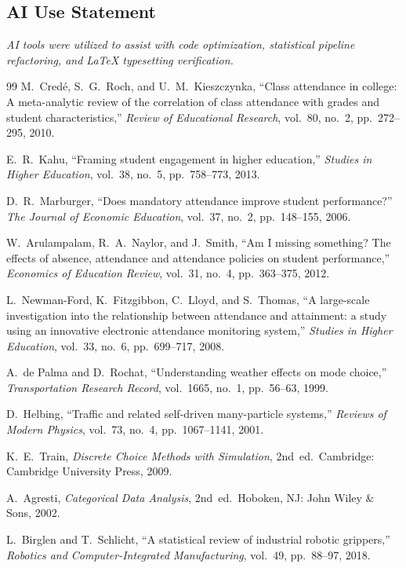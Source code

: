 \documentclass{article}
\begin{document}
\subsection*{AI Use Statement}
\textit{AI tools were utilized to assist with code optimization, statistical pipeline refactoring, and LaTeX typesetting verification.}

\newpage
\begin{thebibliography}{99}
M.~Cred{\'e}, S.~G.~Roch, and U.~M.~Kieszczynka, ``Class attendance in college: A meta-analytic review of the correlation of class attendance with grades and student characteristics,'' \emph{Review of Educational Research}, vol.~80, no.~2, pp.~272--295, 2010.

E.~R.~Kahu, ``Framing student engagement in higher education,'' \emph{Studies in Higher Education}, vol.~38, no.~5, pp.~758--773, 2013.

D.~R.~Marburger, ``Does mandatory attendance improve student performance?'' \emph{The Journal of Economic Education}, vol.~37, no.~2, pp.~148--155, 2006.

W.~Arulampalam, R.~A.~Naylor, and J.~Smith, ``Am I missing something? The effects of absence, attendance and attendance policies on student performance,'' \emph{Economics of Education Review}, vol.~31, no.~4, pp.~363--375, 2012.

L.~Newman-Ford, K.~Fitzgibbon, C.~Lloyd, and S.~Thomas, ``A large-scale investigation into the relationship between attendance and attainment: a study using an innovative electronic attendance monitoring system,'' \emph{Studies in Higher Education}, vol.~33, no.~6, pp.~699--717, 2008.

A.~de Palma and D.~Rochat, ``Understanding weather effects on mode choice,'' \emph{Transportation Research Record}, vol.~1665, no.~1, pp.~56--63, 1999.

D.~Helbing, ``Traffic and related self-driven many-particle systems,'' \emph{Reviews of Modern Physics}, vol.~73, no.~4, pp.~1067--1141, 2001.

K.~E.~Train, \emph{Discrete Choice Methods with Simulation}, 2nd~ed.\ Cambridge: Cambridge University Press, 2009.

A.~Agresti, \emph{Categorical Data Analysis}, 2nd~ed.\ Hoboken, NJ: John Wiley \& Sons, 2002.

L.~Birglen and T.~Schlicht, ``A statistical review of industrial robotic grippers,'' \emph{Robotics and Computer-Integrated Manufacturing}, vol.~49, pp.~88--97, 2018.
\end{thebibliography}
\end{document}
